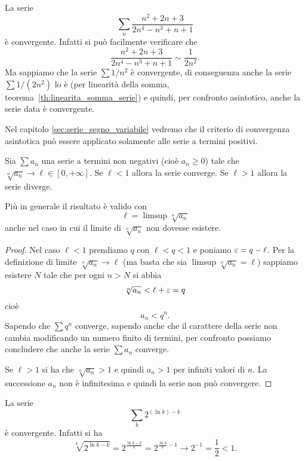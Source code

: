 \begin{example}
La serie
\[
\sum_n \frac{n^2+2n+3}{2n^4-n^3+n+1}
\]
è convergente. Infatti si può facilmente verificare che
\[
   \frac{n^2+2n+3}{2n^4-n^3+n+1} \sim \frac{1}{2n^2}.
\]
Ma sappiamo che la serie $\sum 1/n^2$ è convergente, di conseguenza
anche la serie $\sum 1/(2n^2)$ lo è (per linearità della somma, 
teorema~\ref{th:linearita_somma_serie})
e quindi, per confronto
asintotico, anche la serie data è convergente.
\end{example}

Nel capitolo \ref{sec:serie_segno_variabile} vedremo che il criterio di convergenza 
asintotica può essere applicato solamente alle serie a termini positivi.

\begin{theorem}
Sia $\sum a_n$ una serie a termini non negativi
(cioè $a_n\ge 0$) tale che
\mymark{***}
$\sqrt[n]{a_n} \to \ell \in [0,+\infty]$.
Se $\ell<1$ allora la serie converge.
Se $\ell>1$ allora la serie diverge.

Più in generale il risultato è valido con
\[
  \ell = \limsup \sqrt[n]{a_n}
\]
anche nel caso in cui il limite di $\sqrt[n]{a_n}$ non dovesse esistere.
\end{theorem}
%
\begin{proof}
\mymark{***}
Nel caso $\ell < 1$
prendiamo $q$ con $\ell < q < 1$ e poniamo $\varepsilon = q-\ell$.
Per la definizione di limite $\sqrt[n]{a_n}\to \ell$
(ma basta che sia $\limsup \sqrt[n]{a_n}=\ell$)
sappiamo
esistere $N$ tale che per ogni $n > N$ si abbia
\[
  \sqrt[n]{a_n} < \ell + \varepsilon = q
\]
cioè
\[
   a_n < q^n.
\]
Sapendo che $\sum q^n$ converge, sapendo anche che il carattere
della serie non cambia modificando un numero finito di termini,
per confronto possiamo concludere che anche la serie $\sum a_n$ converge.

Se $\ell>1$ si ha che $\sqrt[n]{a_n}>1$ e quindi $a_n>1$ per infiniti valori di $n$. La successione $a_n$ non è infinitesima e quindi la serie non può convergere.
\end{proof}

\begin{example}
La serie
\[
  \sum_k 2^{(\ln k) - k}
\]
è convergente. Infatti si ha
\[
 \sqrt[k]{2^{\ln k - k}}
 = 2^{\frac{\ln k - k}{k}}
 = 2^{\frac{\ln k }k - 1}
 \to 2^{-1}
 = \frac{1}{2}
 < 1.
\]
\end{example}

